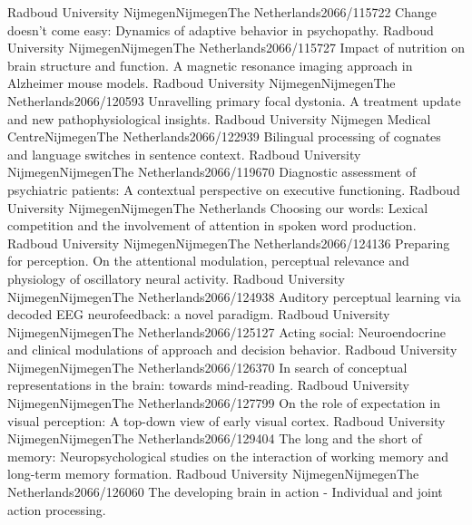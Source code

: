 	{Radboud University Nijmegen}{Nijmegen}{The Netherlands}{2066/115722}
	{Change doesn't come easy: Dynamics of adaptive behavior in psychopathy.}
	{Radboud University Nijmegen}{Nijmegen}{The Netherlands}{2066/115727}
	{ Impact of nutrition on brain structure and function. A magnetic resonance imaging approach in Alzheimer mouse models.}
	{Radboud University Nijmegen}{Nijmegen}{The Netherlands}{2066/120593}
	{Unravelling primary focal dystonia. A treatment update and new pathophysiological insights.}
	{Radboud University Nijmegen Medical Centre}{Nijmegen}{The Netherlands}{2066/122939}
	{Bilingual processing of cognates and language switches in sentence context.}
	{Radboud University Nijmegen}{Nijmegen}{The Netherlands}{2066/119670}
	{Diagnostic assessment of psychiatric patients: A contextual perspective on executive functioning.}
	{Radboud University Nijmegen}{Nijmegen}{The Netherlands}{}
	{Choosing our words: Lexical competition and the involvement of attention in spoken word production.}
	{Radboud University Nijmegen}{Nijmegen}{The Netherlands}{2066/124136}
	{Preparing for perception. On the attentional modulation, perceptual relevance and physiology of oscillatory neural activity.}
	{Radboud University Nijmegen}{Nijmegen}{The Netherlands}{2066/124938}
	{Auditory perceptual learning via decoded EEG neurofeedback: a novel paradigm.}
	{Radboud University Nijmegen}{Nijmegen}{The Netherlands}{2066/125127}
	{Acting social: Neuroendocrine and clinical modulations of approach and decision behavior.}
	{Radboud University Nijmegen}{Nijmegen}{The Netherlands}{2066/126370}
	{In search of conceptual representations in the brain: towards mind-reading.}
	{Radboud University Nijmegen}{Nijmegen}{The Netherlands}{2066/127799}
	{On the role of expectation in visual perception: A top-down view of early visual cortex.}
	{Radboud University Nijmegen}{Nijmegen}{The Netherlands}{2066/129404}
	{The long and the short of memory: Neuropsychological studies on the interaction of working memory and long-term memory formation.}
	{Radboud University Nijmegen}{Nijmegen}{The Netherlands}{2066/126060}
	{The developing brain in action - Individual and joint action processing.}
